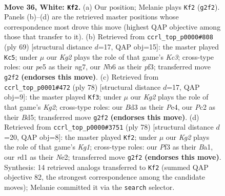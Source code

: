 \documentclass[11pt]{article}
\begin{document}
\clearpage

\begin{figure}[p]\centering
\begin{subfigure}{0.46\textwidth}\centering
\resizebox{\linewidth}{!}{%
\newchessgame
\chessboard[
  setfen={1n6/6k1/1N6/4p1p1/5p2/3B1P2/2P3K1/3r4 w - - 0 36},
  showmover=false,
  pgfstyle=straightmove, color=movearrow, markmove={g2-f2}
]}
\caption{}
\end{subfigure}\hfill
\begin{subfigure}{0.46\textwidth}\centering
\resizebox{\linewidth}{!}{%
\newchessgame
\chessboard[
  setfen={3r4/6N1/2k2p2/Pp6/1Rb4P/5P2/6P1/6K1 b - - 0 35},
  showmover=false,
  pgfstyle=straightmove, color=movearrow, markmove={c6-c5}
]}
\caption{}
\end{subfigure}
\\[4pt]
\begin{subfigure}{0.46\textwidth}\centering
\resizebox{\linewidth}{!}{%
\newchessgame
\chessboard[
  setfen={8/4k1p1/7p/3B3P/4PP2/6P1/6K1/4r3 w - - 3 40},
  showmover=false,
  pgfstyle=straightmove, color=movearrow, markmove={g2-f3}
]}
\caption{}
\end{subfigure}\hfill
\begin{subfigure}{0.46\textwidth}\centering
\resizebox{\linewidth}{!}{%
\newchessgame
\chessboard[
  setfen={6k1/1r6/7p/6p1/5p2/8/4N1PP/B5K1 w - - 0 40},
  showmover=false,
  pgfstyle=straightmove, color=movearrow, markmove={g1-f2}
]}
\caption{}
\end{subfigure}
\caption{\textbf{Move 36, White: \texttt{Kf2}.} (a) Our position; Melanie plays \texttt{Kf2} (\texttt{g2f2}). Panels (b)--(d) are the retrieved master positions whose correspondence most drove this move (highest QAP objective among those that transfer to it). (b) Retrieved from \texttt{ccrl\_top\_p0000\#808} (ply 69) [structural distance $d$=17, QAP obj=15]: the master played \texttt{Kc5}; under $\mu$ our \emph{Kg2} plays the role of that game's \emph{Kc3}; cross-type roles: our \emph{p}e5 as their \emph{n}g7, our \emph{N}b6 as their \emph{p}f3; transferred move \texttt{g2f2} \textbf{(endorses this move)}. (c) Retrieved from \texttt{ccrl\_top\_p0001\#472} (ply 78) [structural distance $d$=17, QAP obj=9]: the master played \texttt{Kf3}; under $\mu$ our \emph{Kg2} plays the role of that game's \emph{Kg2}; cross-type roles: our \emph{B}d3 as their \emph{P}e4, our \emph{P}c2 as their \emph{B}d5; transferred move \texttt{g2f2} \textbf{(endorses this move)}. (d) Retrieved from \texttt{ccrl\_top\_p0000\#3751} (ply 78) [structural distance $d$=20, QAP obj=8]: the master played \texttt{Kf2}; under $\mu$ our \emph{Kg2} plays the role of that game's \emph{Kg1}; cross-type roles: our \emph{P}f3 as their \emph{B}a1, our \emph{r}d1 as their \emph{N}e2; transferred move \texttt{g2f2} \textbf{(endorses this move)}. Synthesis: 14 retrieved analogs transferred to \texttt{Kf2} (summed QAP objective 82, the strongest correspondence among the candidate moves); Melanie committed it via the \texttt{search} selector.}
\label{fig:thought-m70}
\end{figure}
\end{document}
